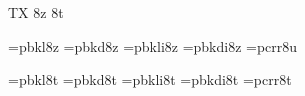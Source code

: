
\ifx\ffdecl\undefined  \fi

\ffdecl [Bookman] {\rm \bf \it \bi} {\caps{\rm\bf}} {} {TX} {8z 8t}

\def\caps{\ffvars{l}{d}{!}{!}\ffsetV{caps}{c}\ffsetX} 
\def\nocaps{\ffsetX} 
\nocaps\relax %
\def\ffwarning#1{\ffmessage{FONT warning: Bookman - \string\caps#1 unavailable}}

\ismacro{}\ifttrue
   \font\tenrm=pbkl8z   \sizespec
   \font\tenbf=pbkd8z   \sizespec
   \font\tenit=pbkli8z  \sizespec
   \font\tenbi=pbkdi8z  \sizespec
   \font\tentt=pcrr8u   \sizespec
   \let\tensl=\tenit

   \def\ffnamegen{pbk\ffvarV\capsV 8z}

   
\fi

\ismacro{}\ifttrue
   \font\tenrm=pbkl8t   \sizespec
   \font\tenbf=pbkd8t   \sizespec
   \font\tenit=pbkli8t  \sizespec
   \font\tenbi=pbkdi8t  \sizespec
   \font\tentt=pcrr8t   \sizespec
   \let\tensl=\tenit

   \def\ffnamegen{pbk\ffvarV\capsV 8t}
\fi

\tenrm

\let\setsimplemath=\relax %

\def\bmTeX{T\kern-.14em\lower.4ex\hbox{E}\kern-.125emX}
\ifx\origTeX\undefined \let\origTeX=\TeX \fi
\let\TeX=\bmTeX

\ifx\loadmathfonts\relax \endinput \fi
\ifx\mathpreloaded X\else  \fi                     


